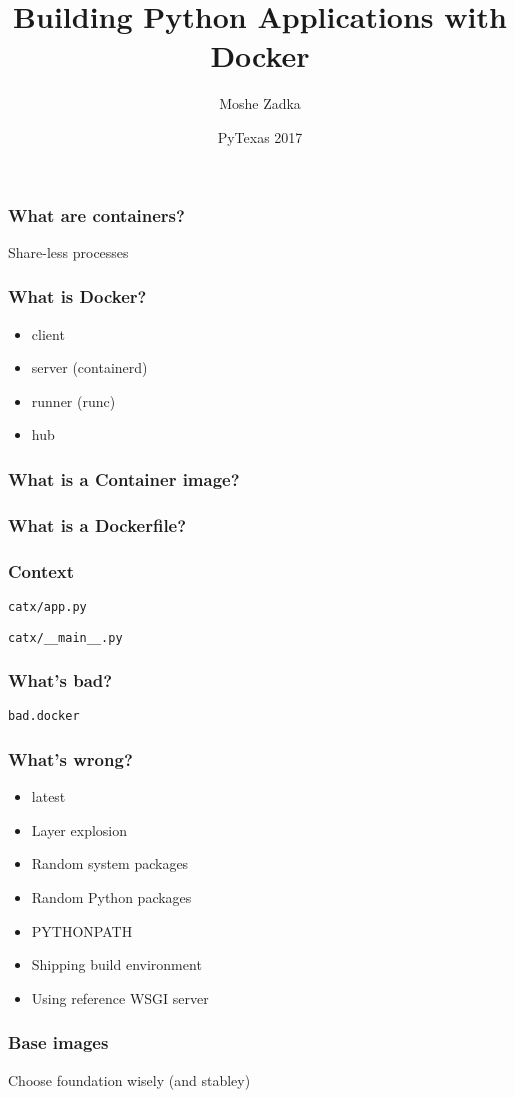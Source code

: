 \documentclass{beamer}
\title{Building Python Applications with Docker}
\author{Moshe Zadka}
\date{PyTexas 2017}
\begin{document}
 
\frame{\titlepage}

\begin{frame}[fragile]
\frametitle{What are containers?}
Share-less processes
\end{frame}

\begin{frame}[fragile]
\frametitle{What is Docker?}
\begin{itemize}
\item client \pause
\item server (containerd) \pause
\item runner (runc) \pause
\item hub
\end{itemize}
\end{frame}

\begin{frame}[fragile]
\frametitle{What is a Container image?}
\end{frame}

\begin{frame}[fragile]
\frametitle{What is a Dockerfile?}
\end{frame}

\begin{frame}[fragile]
\frametitle{Context}
\verb|catx/app.py|

\verb|catx/__main__.py|

\end{frame}

\begin{frame}[fragile]
\frametitle{What's bad?}
\verb|bad.docker|

\end{frame}

\begin{frame}[fragile]
\frametitle{What's wrong?}
\begin{itemize}
\item latest \pause
\item Layer explosion \pause
\item Random system packages \pause
\item Random Python packages \pause
\item PYTHONPATH \pause
\item Shipping build environment \pause
\item Using reference WSGI server
\end{itemize}
\end{frame}

\begin{frame}
\frametitle{Base images}
Choose foundation wisely (and stabley)
\end{frame}
\end{document}
